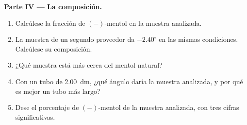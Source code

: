 \begin{problem}
\medskip
\noindent\textbf{Parte IV --- La composición.}
\begin{enumerate}[resume]
  \item Calcúlese la fracción de $(-)$-mentol en la muestra analizada.
  \item La muestra de un segundo proveedor da $-2.40^\circ$ en las mismas
        condiciones. Calcúlese su composición.
  \item ¿Qué muestra está más cerca del mentol natural?
  \item Con un tubo de \qty{2.00}{dm}, ¿qué ángulo daría la muestra
        analizada, y por qué es mejor un tubo más largo?
  \item Dese el porcentaje de $(-)$-mentol de la muestra analizada, con
        tres cifras significativas.
\end{enumerate}
\end{problem}
